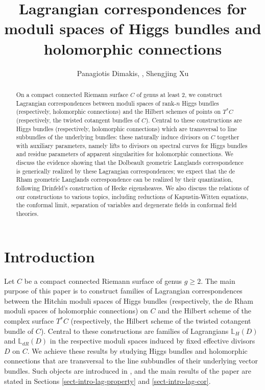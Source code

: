 \documentclass[twoside, 11pt]{article}
\title{Lagrangian correspondences for moduli spaces of Higgs bundles and holomorphic connections}
\author{Panagiotis Dimakis, \dqd, Shengjing Xu}
\date{}
\numberwithin{equation}{section}
\theoremstyle{theorem}
\numberwithin{theorem}{section}
\theoremstyle{definition}
\begin{document}
\maketitle


\begin{abstract}
On a compact connected Riemann surface $C$ of genus at least $2$,
we construct Lagrangian correspondences between moduli spaces of rank-$n$ Higgs bundles (respectively, holomorphic connections) and the Hilbert schemes of points on $T^\ast C$ (respectively, the twisted cotangent bundles of $C$).
Central to these constructions are Higgs bundles (respectively, holomorphic connections) which are transversal to line subbundles of the underlying bundles:
these naturally induce divisors on $C$ together with auxiliary parameters, namely lifts to divisors on spectral curves for Higgs bundles and residue parameters of apparent singularities for holomorphic connections.
We discuss the evidence showing that the Dolbeault geometric Langlands correspondence is generically realized by these Lagrangian correspondences; we expect that the de Rham geometric Langlands correspondence can be realized by their quantization, following Drinfeld's construction of Hecke eigensheaves. 
We also discuss the relations of our constructions to various topics, including reductions of Kapustin-Witten equations, the conformal limit, separation of variables and degenerate fields in conformal field theories. 
\end{abstract}


\tableofcontents

\section{Introduction}
Let $C$ be a compact connected Riemann surface of genus $g \geq 2$. 
The main purpose of this paper is to construct families of Lagrangian correspondences between the Hitchin moduli spaces of Higgs bundles 
(respectively, the de Rham moduli spaces of holomorphic connections) on $C$ 
and the Hilbert scheme of the complex surface $T^\ast C$
(respectively, the Hilbert scheme of the twisted cotangent bundle of $C$). 
Central to these constructions are families of Lagrangians $\mathbb{L}_H(D)$ and $\mathbb{L}_{dR}(D)$ in the respective moduli spaces induced by fixed effective divisors $D$ on $C$.
We achieve these results by studying Higgs bundles and holomorphic connections that are transversal to the line subbundles of their underlying vector bundles.
Such objects are introduced in , and the main results of the paper are stated in Sections \ref{sect-intro-lag-property} and \ref{sect-intro-lag-cor}.
\end{document}
